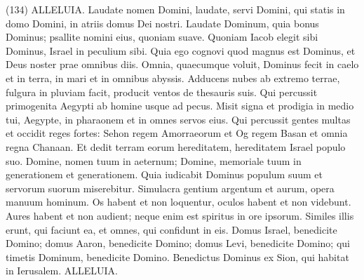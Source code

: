 \begin{biblechapter}  (134) 
\verse ALLELUIA. Laudate nomen Domini, laudate, servi Domini, 
\verse qui statis in domo Domini, in atriis domus Dei nostri. 
\verse Laudate Dominum, quia bonus Dominus; psallite nomini eius, quoniam suave. 
\verse Quoniam Iacob elegit sibi Dominus, Israel in peculium sibi. 
\verse Quia ego cognovi quod magnus est Dominus, et Deus noster prae omnibus diis. 
\verse Omnia, quaecumque voluit, Dominus fecit in caelo et in terra, in mari et in omnibus abyssis. 
\verse Adducens nubes ab extremo terrae, fulgura in pluviam facit, producit ventos de thesauris suis. 
\verse Qui percussit primogenita Aegypti ab homine usque ad pecus. 
\verse Misit signa et prodigia in medio tui, Aegypte, in pharaonem et in omnes servos eius. 
\verse Qui percussit gentes multas et occidit reges fortes: 
\verse Sehon regem Amorraeorum et Og regem Basan et omnia regna Chanaan. 
\verse Et dedit terram eorum hereditatem, hereditatem Israel populo suo. 
\verse Domine, nomen tuum in aeternum; Domine, memoriale tuum in generationem et generationem. 
\verse Quia iudicabit Dominus populum suum et servorum suorum miserebitur. 
\verse Simulacra gentium argentum et aurum, opera manuum hominum. 
\verse Os habent et non loquentur, oculos habent et non videbunt. 
\verse Aures habent et non audient; neque enim est spiritus in ore ipsorum. 
\verse Similes illis erunt, qui faciunt ea, et omnes, qui confidunt in eis. 
\verse Domus Israel, benedicite Domino; domus Aaron, benedicite Domino; 
\verse domus Levi, benedicite Domino; qui timetis Dominum, benedicite Domino. 
\verse Benedictus Dominus ex Sion, qui habitat in Ierusalem. ALLELUIA. 
\end{biblechapter}

